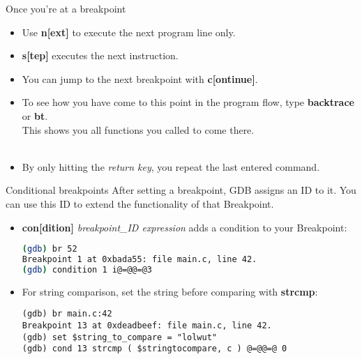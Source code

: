 \begin{frame}{Once you're at a breakpoint}
	\begin{itemize}
		\item Use \textbf{n[ext]} to execute the next program line only.
		\item \textbf{s[tep]} executes the next instruction.
		\item You can jump to the next breakpoint with \textbf{c[ontinue]}.
		\item To see how you have come to this point in the program flow, type \textbf{backtrace} or \textbf{bt}.\\
		This shows you all functions you called to come there.
		\\\ \\
		\item By only hitting the \textit{return key}, you repeat the last entered  command.
	\end{itemize}
	
\end{frame}
\begin{frame}[fragile]{Conditional breakpoints}
After setting a breakpoint, GDB assigns an ID to it. You can use this ID to extend the functionality of that Breakpoint.\bigskip
	\begin{itemize}
		\item \textbf{con[dition]} \textit{breakpoint\_ID expression} adds a condition to your Breakpoint:
		\begin{lstlisting}[numbers=none,language=bash]
(gdb) br 52
Breakpoint 1 at 0xbada55: file main.c, line 42.
(gdb) condition 1 i@=@@=@3
\end{lstlisting}\bigskip
		\item For string comparison, set the string before comparing with \textbf{strcmp}:
		\begin{lstlisting}
(gdb) br main.c:42
Breakpoint 13 at 0xdeadbeef: file main.c, line 42.
(gdb) set $string_to_compare = "lolwut"
(gdb) cond 13 strcmp ( $stringtocompare, c ) @=@@=@ 0
\end{lstlisting}
	\end{itemize}
\end{frame}

